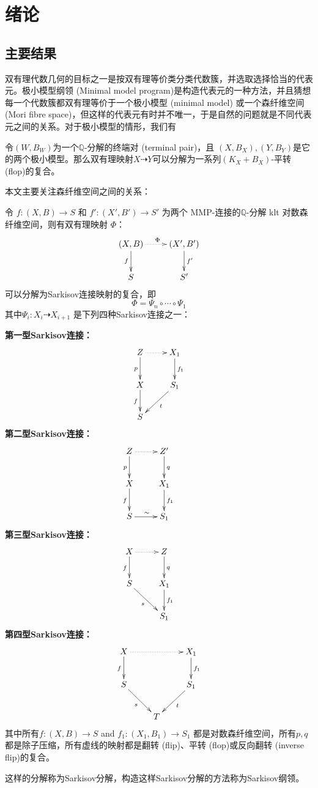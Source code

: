 \chapter{绪论}
\section{主要结果}
双有理代数几何的目标之一是按双有理等价类分类代数簇，并选取选择恰当的代表元。极小模型纲领 (Minimal model program)是构造代表元的一种方法，并且猜想每一个代数簇都双有理等价于一个极小模型 (minimal model) 或一个森纤维空间 (Mori fibre space)，但这样的代表元有时并不唯一，于是自然的问题就是不同代表元之间的关系。对于极小模型的情形，我们有
\begin{theorem}[平转连接极小模型]
	令$(W,B_{W})$为一个$\mathbb{Q}$-分解的终端对 (terminal pair)，且 $(X,B_{X}), (Y,B_{Y})$是它的两个极小模型。那么双有理映射$X \dashrightarrow Y$可以分解为一系列$(K_{X}+B_{X})$-平转 (flop)的复合。
\end{theorem}

本文主要关注森纤维空间之间的关系：
\begin{theorem}[Sarkisov分解]\label{main}
	令 $ f:(X, B)\to S$ 和 $f':(X', B')\to S' $ 为两个 MMP-连接的$ \mathbb{Q} $-分解 klt 对数森纤维空间，则有双有理映射 $\Phi$：
	\[ \xymatrix{
			(X,B)\ar[d]_{f}\ar@{.>}[r]^\Phi & (X',B')\ar[d]^{f'}\\
			S & S'} \]
	可以分解为Sarkisov连接映射的复合，即
	\[ \Phi=\Psi_{n}\circ \cdots \circ \Psi_{1} \]
	其中$\Psi_{i}:X_{i}\dashrightarrow X_{i+1} $ 是下列四种Sarkisov连接之一：

  \textbf{第一型Sarkisov连接：}
  \[\xymatrix{
			Z\ar[d]_{p}\ar@{.>}[r]&X_{1}\ar[d]^{f_1}\\
			X\ar[d]_{f}&S_1\ar[dl]^{t}\\
  S &}\]
  \textbf{第二型Sarkisov连接：}
  \[\xymatrix{
			Z\ar[d]_{p}\ar@{.>}[r]&Z'\ar[d]^{q}&\\
			X\ar[d]_{f}&X_1\ar[d]^{f_1}\\
  S\ar[r]^{\sim}&S_1}\]
  \textbf{第三型Sarkisov连接：}
\[ \xymatrix{
		X\ar@{.>}[r]\ar[d]_{f}& Z\ar[d]^q& \\
		S\ar[rd]_{s}         & X_{1}\ar[d]^{f_{1}}&\\
		&S_{1}
		} \]
  \textbf{第四型Sarkisov连接：}
\[ \xymatrix{
			X \ar[d]_f\ar@{.>}[rr]&&X_{1}\ar[d]^{f_1}\\
			S \ar[dr]_{s}&&S_{1} \ar[dl]^{t}\\
			&T &} \]
	其中所有$ f:(X, B)\to S $ and $ f_1:(X_1, B_1)\to S_1 $ 都是对数森纤维空间，所有$p,q$ 都是除子压缩，所有虚线的映射都是翻转 (flip)、平转 (flop)或反向翻转 (inverse flip)的复合。
\end{theorem}
这样的分解称为Sarkisov分解，构造这样Sarkisov分解的方法称为Sarkisov纲领。

